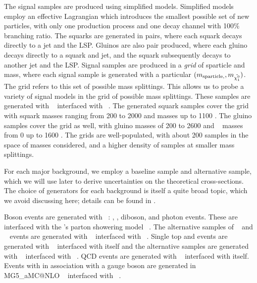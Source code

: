 The signal samples are produced using simplified models.
Simplified models employ an effective Lagrangian which introduces the smallest possible set of new particles, with only one production process and one decay channel with 100\% branching ratio.
The squarks are generated in pairs, where each squark decays directly to a jet and the LSP.
Gluinos are also pair produced, where each gluino decays directly to a squark and jet, and the squark subsequently decays to another jet and the LSP.
Signal samples are produced in a \textit{grid} of sparticle and \lsp~ mass, where each signal sample is generated with a particular $(m_{\text{sparticle}, }, m_{\tilde{\chi^0_1}})$.
The grid refers to this set of possible mass splittings.
This allows us to probe a variety of signal models in the grid of possible mass splittings.
These samples are generated with \madgraph ~\cite{madgraph1} interfaced with \PYTHIAEight ~\cite{Sjostrand:2014zea}.
The generated squark samples cover the grid with squark masses ranging from 200 \GeV to 2000 \GeV and \lsp masses up to 1100 \GeV.
The gluino samples cover the grid as well, with gluino masses of 200 \GeV to 2600 \GeV and \lsp~ masses from 0 \GeV up to 1600 \GeV.
The grids are well-populated, with about 200 samples in the space of masses considered, and a higher density of samples at smaller mass splittings.


For each major background, we employ a baseline sample and alternative sample, which we will use later to derive uncertainties on the theoretical cross-sections.
The choice of generators for each background is itself a quite broad topic, which we avoid discussing here; details can be found in \cite{SOFT-2010-01}.

Boson events are generated with \sherpa~\cite{Gleisberg:2008ta}: \zjets, \wjets, diboson, and photon events.
These are interfaced with the \sherpa's parton showering model ~\cite{sherpashower}.
The alternative samples of \zjets~ and \wjets~ events are generated with \madgraph ~\cite{madgraph1} interfaced with \PYTHIAEight ~\cite{Sjostrand:2014zea}.
Single top and \ttbar events are generated with \powhegbox ~\cite{powheg-box} interfaced with itself and the alternative samples are generated with \mcatnlo ~\cite{Alwall:2014hca} interfaced with \HERWIGPP ~\cite{Frixione:2010ra}.
QCD events are generated with \PYTHIAEight ~\cite{Sjostrand:2014zea} interfaced with itself.
Events with \ttbar in association with a gauge boson are generated in MG5\_aMC@NLO ~\cite{Alwall:2014hca} interfaced with \PYTHIAEight ~\cite{Sjostrand:2014zea}.

